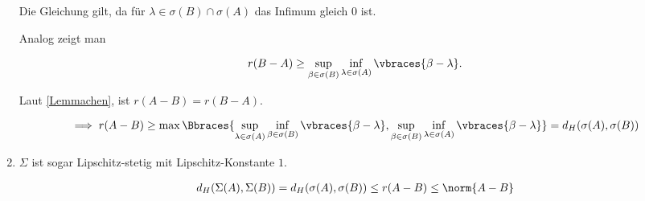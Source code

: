 \begin{solution}
\begin{enumerate}[label = (\alph*)]
  Die Gleichung gilt, da für $\lambda \in \sigma(B) \cap \sigma(A)$ das Infimum gleich $0$ ist.

  Analog zeigt man

  \begin{align*}
    r(B - A)
    \geq
    \sup_{\beta \in \sigma(B)}
    \inf_{\lambda \in \sigma(A)}
    \vbraces{\beta - \lambda}.
  \end{align*}

  Laut \eqref{Lemmachen}, ist $r(A - B) = r(B - A)$.

  \begin{align*}
    \implies
    r(A-B)
    \geq
    \max \Bbraces
    {
      \sup_{\lambda \in \sigma(A)}
      \inf_{\beta \in \sigma(B)}
      \vbraces{\beta - \lambda},
      \sup_{\beta \in \sigma(B)}
      \inf_{\lambda \in \sigma(A)}
      \vbraces{\beta - \lambda}
    }
    =
    d_H(\sigma(A), \sigma(B))
  \end{align*}

  \item
  $\Sigma$ ist sogar Lipschitz-stetig mit Lipschitz-Konstante $1$.

  \begin{align*}
    d_H(\Sigma(A), \Sigma(B))
    =
    d_H(\sigma(A), \sigma(B))
    \leq
    r(A-B)
    \leq
    \norm{A - B}
  \end{align*}

\end{enumerate}

\end{solution}
